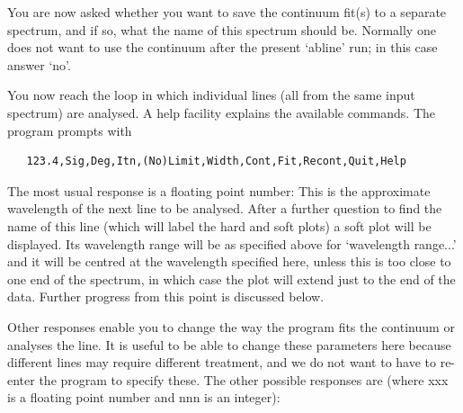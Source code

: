    You are now asked whether you want to save the continuum fit(s) to a
   separate spectrum, and if so, what the name of this spectrum should
   be. Normally one does not want to use the continuum after the present
   `abline' run; in this case answer `no'.

   You now reach the loop in which individual lines (all from the same
   input spectrum) are analysed. A help facility explains the available
   commands. The program prompts with

\begin{verbatim}
   123.4,Sig,Deg,Itn,(No)Limit,Width,Cont,Fit,Recont,Quit,Help
\end{verbatim}

   The most usual response is a floating point number: This is the
   approximate wavelength of the next line to be analysed. After a
   further question to find the name of this line (which will label the
   hard and soft plots) a soft plot will be displayed. Its wavelength
   range will be as specified above for `wavelength range...' and it
   will be centred at the wavelength specified here, unless this is too
   close to one end of the spectrum, in which case the plot will extend
   just to the end of the data. Further progress from this point is
   discussed below.

   Other responses enable you to change the way the program fits the
   continuum or analyses the line. It is useful to be able to change
   these parameters here because different lines may require different
   treatment, and we do not want to have to re-enter the program to
   specify these. The other possible responses are (where xxx is a
   floating point number and nnn is an integer):

